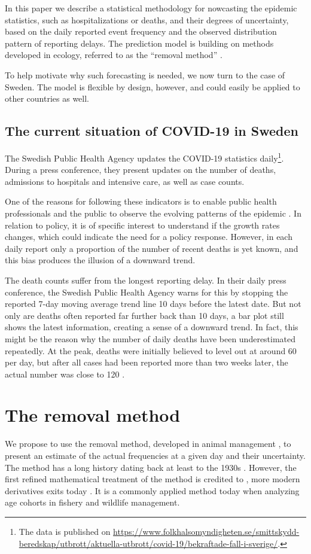 \documentclass[a4paper,11pth]{article}
\begin{document}
In this paper we describe a statistical methodology for nowcasting the epidemic statistics, such as hospitalizations or deaths, and their degrees of uncertainty, based on the daily reported event frequency and the observed distribution pattern of reporting delays. The prediction model is building on methods developed in ecology, referred to as the ``removal method'' \citep{Pollock1991_review_papers}.

To help motivate why such forecasting is needed, we now turn to the case of Sweden. The model is flexible by design, however, and could easily be applied to other countries as well.

\subsection{The current situation of COVID-19 in Sweden}
The Swedish Public Health Agency updates the COVID-19 statistics daily\footnote{The data is published on \url{https://www.folkhalsomyndigheten.se/smittskydd-beredskap/utbrott/aktuella-utbrott/covid-19/bekraftade-fall-i-sverige/}.}. During a press conference, they present updates on the number of deaths, admissions to hospitals and intensive care, as well as case counts.

One of the reasons for following these indicators is to enable public health professionals and the public to observe the evolving patterns of the epidemic \citep{Anderson2020_how_will}. In relation to policy, it is of specific interest to understand if the growth rates changes, which could indicate the need for a policy response. However, in each daily report only a proportion of the number of recent deaths is yet known, and this bias produces the illusion of a downward trend.

The death counts suffer from the longest reporting delay. In their daily press conference, the Swedish Public Health Agency warns for this by stopping the reported 7-day moving average trend line 10 days before the latest date. But not only are deaths often reported far further back than 10 days, a bar plot still shows the latest information, creating a sense of a downward trend. In fact, this might be the reason why the number of daily deaths have been underestimated repeatedly. At the peak, deaths were initially believed to level out at around 60 per day, but after all cases had been reported more than two weeks later, the actual number was close to 120 \citep{Ohman2020_antalet_virusdoda}.

\section{The removal method}
We propose to use the removal method, developed in animal management \citep{Pollock1991_review_papers}, to present an estimate of the actual frequencies at a given day and their uncertainty. The method has a long history dating back at least to the 1930s \citep{Leslie1939_attempt_determine}. However, the first refined mathematical treatment of the method is credited to \citet{Moran1951_mathematical_theory}, more modern derivatives exits today \citep{Matechou2016_open_models}. It is a commonly applied method today when analyzing age cohorts in fishery and wildlife management.
\end{document}
